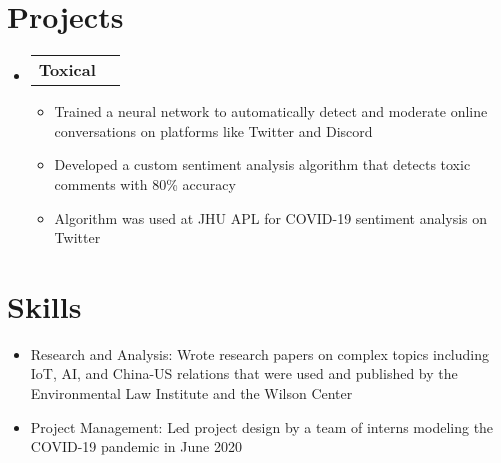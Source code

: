\documentclass[letterpaper,11pt]{article}
\makeatletter
\newcommand{\resumeItem}[1]{
  \item\small{
    {#1} \vspace{-2pt}
  }
}
\newcommand{\resumeSubheadingTwo}[2]{
  \vspace{-1pt}\item
    \begin{tabular*}{0.97\textwidth}{l@{\extracolsep{\fill}}r}
      \textbf{#1} & #2 \\
    \end{tabular*}\vspace{-5pt}
}
\newcommand{\resumeSubItem}[2]{\resumeItem{#1}{#2}\vspace{-4pt}}
\newcommand{\resumeSubHeadingListStart}{\begin{itemize}[leftmargin=*]}
\newcommand{\resumeSubHeadingListEnd}{\end{itemize}}
\newcommand{\resumeItemListStart}{\begin{itemize}}
\newcommand{\resumeItemListEnd}{\end{itemize}\vspace{-5pt}}
\makeatother
\begin{document}
\section{Projects}
  \resumeSubHeadingListStart
    \resumeSubheadingTwo{Toxical}{}
        \resumeItemListStart
            \resumeItem{Trained a neural network to automatically detect and moderate online conversations on platforms like Twitter and Discord}
            \resumeItem{Developed a custom sentiment analysis algorithm that detects toxic comments with 80\% accuracy}
            \resumeItem{Algorithm was used at JHU APL for COVID-19 sentiment analysis on Twitter}
        \resumeItemListEnd
  \resumeSubHeadingListEnd

              
        

\section{Skills}
 \resumeSubHeadingListStart
    \resumeSubItem{Research and Analysis:}{Wrote research papers on complex topics including IoT, AI, and China-US relations that were used and published by the Environmental Law Institute and the Wilson Center}
    \resumeSubItem{Project Management:}{Led project design by a team of interns modeling the COVID-19 pandemic in June 2020}
 \resumeSubHeadingListEnd

\end{document}
